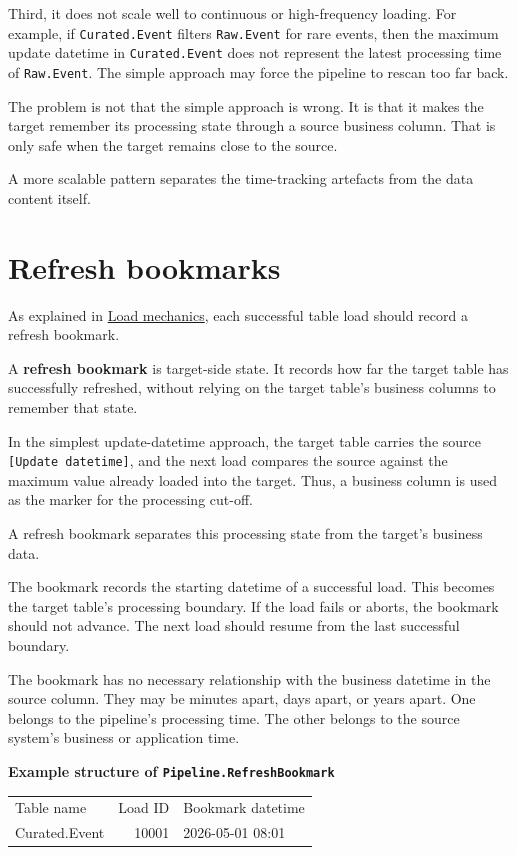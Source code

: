 \documentclass[10pt,openany,10pt]{book}
\newcounter{none}
\let\podeToprule\toprule
\let\podeMidrule\midrule
\let\podeBottomrule\bottomrule
\renewcommand{\toprule}{\arrayrulecolor{pbiGrid}\podeToprule}
\renewcommand{\midrule}{\arrayrulecolor{pbiGrid}\podeMidrule}
\renewcommand{\bottomrule}{\arrayrulecolor{pbiGrid}\podeBottomrule}
\begin{document}
Third, it does not scale well to continuous or high-frequency loading.
For example, if \texttt{Curated.Event} filters \texttt{Raw.Event} for
rare events, then the maximum update datetime in \texttt{Curated.Event}
does not represent the latest processing time of \texttt{Raw.Event}. The
simple approach may force the pipeline to rescan too far back.

The problem is not that the simple approach is wrong. It is that it
makes the target remember its processing state through a source business
column. That is only safe when the target remains close to the source.

A more scalable pattern separates the time-tracking artefacts from the
data content itself.

\section{Refresh bookmarks}\label{refresh-bookmarks}

As explained in
\hyperref[docs-efficient-stable-pipeline-load-mechanics]{Load
mechanics}, each successful table load should record a refresh bookmark.

A \textbf{refresh bookmark} is target-side state. It records how far the
target table has successfully refreshed, without relying on the target
table's business columns to remember that state.

In the simplest update-datetime approach, the target table carries the
source \texttt{{[}Update\ datetime{]}}, and the next load compares the
source against the maximum value already loaded into the target. Thus, a
business column is used as the marker for the processing cut-off.

A refresh bookmark separates this processing state from the target's
business data.

The bookmark records the starting datetime of a successful load. This
becomes the target table's processing boundary. If the load fails or
aborts, the bookmark should not advance. The next load should resume
from the last successful boundary.

The bookmark has no necessary relationship with the business datetime in
the source column. They may be minutes apart, days apart, or years
apart. One belongs to the pipeline's processing time. The other belongs
to the source system's business or application time.

\textbf{Example structure of \texttt{Pipeline.RefreshBookmark}}

{\def\LTcaptype{none} %
\begin{longtable}[]{@{}lrl@{}}
\toprule\noalign{}
Table name & Load ID & Bookmark datetime \\
\midrule\noalign{}
\endhead
\bottomrule\noalign{}
\endlastfoot
Curated.Event & 10001 & 2026-05-01 08:01 \\
\end{longtable}
}
\end{document}
